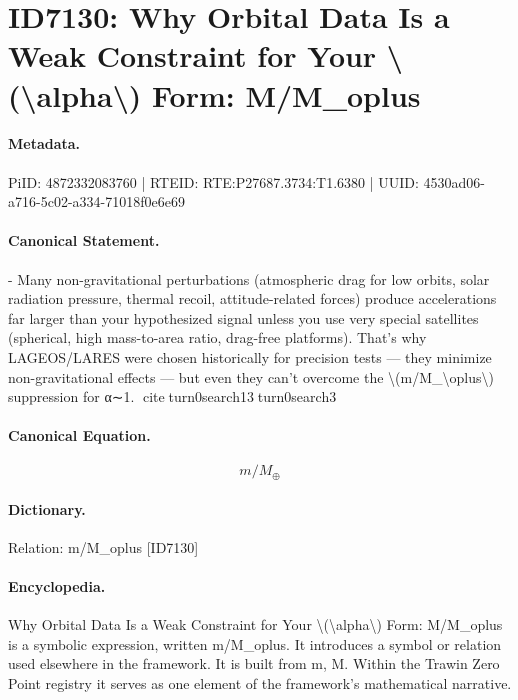 \section*{ID7130: Why Orbital Data Is a Weak Constraint for Your \textbackslash{}(\textbackslash{}alpha\textbackslash{}) Form: M/M\_oplus}
\paragraph{Metadata.}
PiID: 4872332083760 | RTEID: RTE:P27687.3734:T1.6380 | UUID: 4530ad06-a716-5c02-a334-71018f0e6e69

\paragraph{Canonical Statement.}
- Many non-gravitational perturbations (atmospheric drag for low orbits, solar radiation pressure, thermal recoil, attitude-related forces) produce accelerations far larger than your hypothesized signal unless you use very special satellites (spherical, high mass-to-area ratio, drag-free platforms). That’s why LAGEOS/LARES were chosen historically for precision tests — they minimize non-gravitational effects — but even they can’t overcome the \textbackslash{}(m/M\_\textbackslash{}oplus\textbackslash{}) suppression for α∼1. citeturn0search13turn0search3

\paragraph{Canonical Equation.}
\[
m/M_\oplus
\]

\paragraph{Dictionary.}
Relation: m/M\_oplus [ID7130]

\paragraph{Encyclopedia.}
Why Orbital Data Is a Weak Constraint for Your \textbackslash{}(\textbackslash{}alpha\textbackslash{}) Form: M/M\_oplus is a symbolic expression, written m/M\_oplus. It introduces a symbol or relation used elsewhere in the framework. It is built from m, M. Within the Trawin Zero Point registry it serves as one element of the framework's mathematical narrative.
